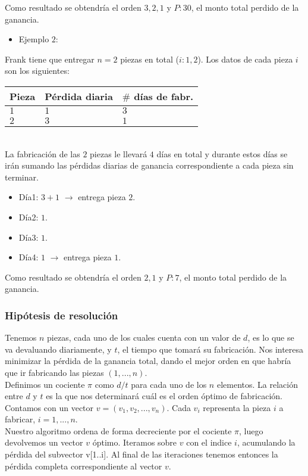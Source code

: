 \documentclass[11pt, a4paper, twoside]{article}
\begin{document}
Como resultado se obtendría el orden $3,2,1$ y $P:30$, el monto total perdido de la ganancia. \\

\begin{itemize}
	\item Ejemplo $2$: 
\end{itemize}

Frank tiene que entregar $n=2$ piezas en total ($i:1,2$). Los datos de cada pieza $i$ son los siguientes: \\

\begin{tabular}{|l|l|l|}
	\hline
	Pieza &  Pérdida diaria & $\#$ días de fabr.\\
	\hline
	$1$   &     $1$         & $3$               \\
	\hline 
	$2$   &     $3$         & $1$               \\
	\hline 
\end{tabular} \\ 
    
La fabricación de las $2$ piezas le llevará $4$ días en total y durante estos días se irán sumando las pérdidas 
diarias de ganancia correspondiente a cada pieza sin terminar. 

\begin{itemize}
	\item Día1: $3+1$ $\rightarrow$ entrega pieza $2$. 
	\item Día2: $1$. 
	\item Día3: $1$.
	\item Día4: $1$ $\rightarrow$ entrega pieza $1$.
\end{itemize}  	
	
Como resultado se obtendría el orden $2,1$ y $P:7$, el monto total perdido de la ganancia. 

\subsubsection{Hipótesis de resolución}

Tenemos $n$ piezas, cada uno de los cuales cuenta con un valor de $d$, es lo que se va devaluando diariamente,
y $t$, el tiempo que tomará su fabricación. Nos interesa minimizar la pérdida de la ganancia total, dando el mejor
orden en que habría que ir fabricando las piezas $(1,...,n)$. \\
Definimos un cociente $\pi$ como $d/t$ para cada uno de los $n$ elementos. La relación entre $d$ y $t$ es la que nos
determinará cuál es el orden óptimo de fabricación. \\
Contamos con un vector $v = (v_1,v_2,...,v_n)$. Cada $v_i$ representa la pieza $i$ a fabricar, $i=1,...,n$. \\ 
Nuestro algoritmo ordena de forma decreciente por el cociente $\pi$, luego devolvemos un vector $v$ óptimo. 
Iteramos sobre $v$ con el indice $i$, acumulando la pérdida del subvector v[1..i]. 
Al final de las iteraciones tenemos entonces la pérdida completa correspondiente al vector $v$.
\end{document}
